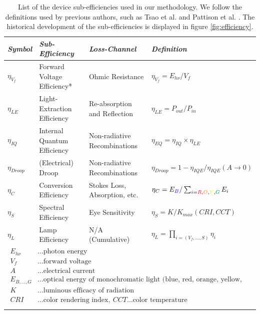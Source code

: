 \documentclass[a4paper,nocompress]{spie}  %
\begin{document}
        \begin{table}[h!]
        \caption{List of the device sub-efficiencies used in our methodology. We follow the definitions used by previous authors, such as Tsao et al. \cite{tsao2010solid} and Pattison et al. \cite{pattison2017solid}. The historical development of the sub-efficiencies is displayed in figure \ref{fig:efficiency}.}
        \bigskip
        \centering
    	\begin{tabularx}{\textwidth}{|l|l|l|X|}
    		\hline
    			\textit{Symbol} & \textit{Sub-Efficiency} & \textit{Loss-Channel} & \textit{Definition} \\
    		\hline
    		    $\eta_{V_f}$ & Forward Voltage Efficiency* & Ohmic Resistance & $\eta_{V_f} = E_{h\nu} / V_f $ \\
    		\hline
    		    $\eta_{LE}$ & Light-Extraction Efficiency & Re-absorption and Reflection & $\eta_{LE}= P_{out} / P_{in} $ \\
    		\hline
    		    $\eta_{IQ}$ & Internal Quantum Efficiency & Non-radiative Recombinations & $\eta_{EQ} = \eta_{IQ} \times \eta_{LE}$ \\
    		\hline
    		    $\eta_{Droop}$ & (Electrical) Droop & Non-radiative Recombinations & $\eta_{Droop} = 1 - \eta_{IQE} / \eta_{IQE}(A \rightarrow 0) $ \\
    		\hline
    		    $\eta_C$ & Conversion Efficiency & Stokes Loss, Absorption, etc. & $\eta_{C} = E_{\textcolor{blue}{B}} / \sum_{i=\textcolor{red}{R},\textcolor{orange}{O},\textcolor{yellow}{Y},\textcolor{teal}{G}} E_i$ \\
    		\hline
    		    $\eta_{S}$ & Spectral Efficiency & Eye Sensitivity & $\eta_{S} = K / K_{max}(CRI,CCT)$ \\
    		\hline
    		    $\eta_L$ & Lamp Efficiency & N/A (Cumulative) & $\eta_L = \prod_{i=(V_f,\dots,S)} \eta_i$ \\
            \hline
                \multicolumn{4}{|l|}{$\!\begin{aligned}
                    E_{h\nu} &\dots \text{photon energy} \\
                    V_f &\dots \text{forward voltage} \\
                    A &\dots \text{electrical current} \\
                    E_{B,\dots,G} &\dots \text{optical energy of monochromatic light (blue, red, orange, yellow, green)} \\
                    K &\dots \text{luminous efficacy of radiation} \\
                    CRI &\dots \text{color rendering index}, \ CCT \dots \text{color temperature} \\
                \end{aligned}$} \\
            \hline
    	\end{tabularx}
    	\label{tab:eff}
    \end{table}
    
\end{document}
